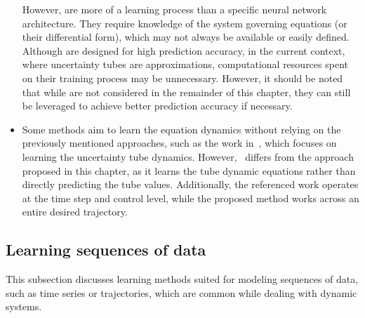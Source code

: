 \begin{itemize}
    However,  are more of a learning process than a specific neural network architecture.
    They require knowledge of the system governing equations (or their differential form), which may not always be available or easily defined.
    Although  are designed for high prediction accuracy, in the current context, where uncertainty tubes are approximations, computational resources spent on their training process may be unnecessary.
    However, it should be noted that while  are not considered in the remainder of this chapter, they can still be leveraged to achieve better prediction accuracy if necessary.
    \item Some methods aim to learn the equation dynamics without relying on the previously mentioned approaches, such as the work in~\cite{cTubeMPCLearning}, which focuses on learning the uncertainty tube dynamics.
    However,~\cite{cTubeMPCLearning} differs from the approach proposed in this chapter, as it learns the tube dynamic equations rather than directly predicting the tube values. 
    Additionally, the referenced work operates at the time step and control level, while the proposed method works across an entire desired trajectory.
\end{itemize}

\subsection{Learning sequences of data}

This subsection discusses learning methods suited for modeling sequences of data, such as time series or trajectories, which are common while dealing with dynamic systems.

